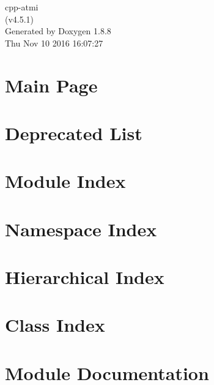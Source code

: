 \documentclass[twoside]{book}
\newcommand{\+}{\discretionary{\mbox{\scriptsize$\hookleftarrow$}}{}{}}
\newcommand{\clearemptydoublepage}{%
  \newpage{\pagestyle{empty}\cleardoublepage}%
}
\begin{document}
\hypersetup{pageanchor=false,
             bookmarks=true,
             bookmarksnumbered=true,
             pdfencoding=unicode
            }
\begin{titlepage}
\vspace*{7cm}
\begin{center}%
{\Large cpp-\/atmi \\[1ex]\large (v4.\+5.\+1) }\\
\vspace*{1cm}
{\large Generated by Doxygen 1.8.8}\\
\vspace*{0.5cm}
{\small Thu Nov 10 2016 16:07:27}\\
\end{center}
\end{titlepage}
\clearemptydoublepage
\tableofcontents
\clearemptydoublepage
{}
\hypersetup{pageanchor=true}

\chapter{Main Page}
\label{index}\hypertarget{index}{}
\chapter{Deprecated List}
\label{deprecated}
\hypertarget{deprecated}{}

\chapter{Module Index}

\chapter{Namespace Index}

\chapter{Hierarchical Index}

\chapter{Class Index}

\chapter{Module Documentation}





\end{document}
